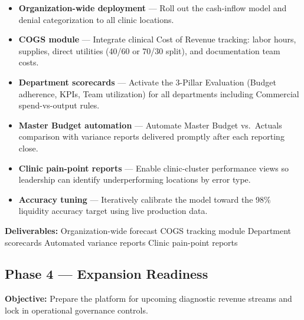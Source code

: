 \documentclass[11pt,a4paper]{article}
\begin{document}
\begin{tcolorbox}[infobox,title={Activities}]
\begin{itemize}
  \item \textbf{Organization-wide deployment} --- Roll out the cash-inflow model and denial
        categorization to all clinic locations.
  \item \textbf{COGS module} --- Integrate clinical Cost of Revenue tracking: labor hours,
        supplies, direct utilities (40/60 or 70/30 split), and documentation team costs.
  \item \textbf{Department scorecards} --- Activate the 3-Pillar Evaluation (Budget adherence,
        KPIs, Team utilization) for all departments including Commercial spend-vs-output rules.
  \item \textbf{Master Budget automation} --- Automate Master Budget vs.\ Actuals comparison
        with variance reports delivered promptly after each reporting close.
  \item \textbf{Clinic pain-point reports} --- Enable clinic-cluster performance views so
        leadership can identify underperforming locations by error type.
  \item \textbf{Accuracy tuning} --- Iteratively calibrate the model toward the 98\%
        liquidity accuracy target using live production data.
\end{itemize}
\end{tcolorbox}

\textbf{Deliverables:} Organization-wide forecast \textbullet{} COGS tracking module
\textbullet{} Department scorecards \textbullet{} Automated variance reports
\textbullet{} Clinic pain-point reports

\subsection{Phase 4 --- Expansion Readiness}

\textbf{Objective:} Prepare the platform for upcoming diagnostic revenue streams and
lock in operational governance controls.
\end{document}

